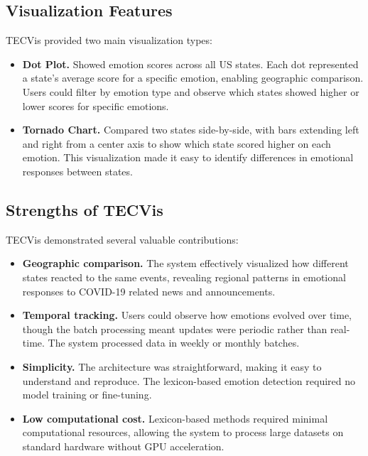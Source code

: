 \subsection{Visualization Features}

TECVis provided two main visualization types:

\begin{itemize}
\item \textbf{Dot Plot.} Showed emotion scores across all US states. Each dot represented a state's average score for a specific emotion, enabling geographic comparison. Users could filter by emotion type and observe which states showed higher or lower scores for specific emotions.

\item \textbf{Tornado Chart.} Compared two states side-by-side, with bars extending left and right from a center axis to show which state scored higher on each emotion. This visualization made it easy to identify differences in emotional responses between states.
\end{itemize}

\subsection{Strengths of TECVis}

TECVis demonstrated several valuable contributions:

\begin{itemize}
\item \textbf{Geographic comparison.} The system effectively visualized how different states reacted to the same events, revealing regional patterns in emotional responses to COVID-19 related news and announcements.

\item \textbf{Temporal tracking.} Users could observe how emotions evolved over time, though the batch processing meant updates were periodic rather than real-time. The system processed data in weekly or monthly batches.

\item \textbf{Simplicity.} The architecture was straightforward, making it easy to understand and reproduce. The lexicon-based emotion detection required no model training or fine-tuning.

\item \textbf{Low computational cost.} Lexicon-based methods required minimal computational resources, allowing the system to process large datasets on standard hardware without GPU acceleration.
\end{itemize}

